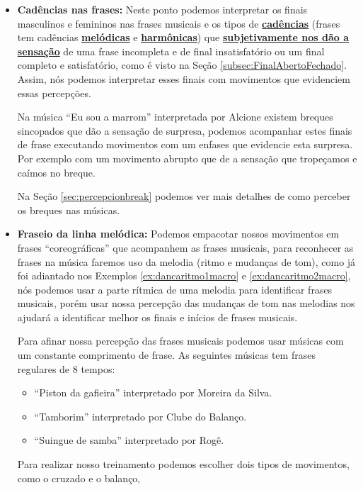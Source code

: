 \begin{itemize}
\begin{example}
\end{example}  
\item \textbf{Cadências nas frases:} Neste ponto podemos interpretar
os finais masculinos e femininos nas frases musicais  e  
os tipos de \hyperref[sec:Cadencia]{\textbf{cadências}}
(frases tem cadências 
\hyperref[subsec:cadenciamelodica]{\textbf{melódicas}} e 
\hyperref[sec:CadenciaHarmonica]{\textbf{harmônicas}})   
que \hyperref[subsec:FinalAbertoFechado]{\textbf{subjetivamente nos dão a sensação}} 
de uma frase incompleta e de final insatisfatório ou um final completo e satisfatório, como é visto na Seção \ref{subsec:FinalAbertoFechado}.
Assim, nós podemos interpretar esses finais com movimentos que evidenciem 
essas percepções.
\begin{example}
Na música ``Eu sou a marrom'' interpretada por Alcione existem breques sincopados
que dão a sensação de surpresa, podemos acompanhar estes finais de frase executando movimentos 
com um enfases que evidencie esta surpresa. Por exemplo com um movimento abrupto 
que de a sensação que tropeçamos e caímos no breque. 
\end{example}  
Na Seção \ref{sec:percepcionbreak} podemos ver mais detalhes de como perceber os breques nas músicas.
\item \textbf{Fraseio da linha melódica:} Podemos empacotar nossos movimentos em frases ``coreográficas''
que acompanhem as frases musicais, para reconhecer as frases na música faremos uso da melodia (ritmo e mudanças de tom),
como já foi adiantado nos Exemplos \ref{ex:dancaritmo1macro} e \ref{ex:dancaritmo2macro},
nós podemos usar a parte rítmica de uma melodia para identificar frases musicais,
porém usar nossa percepção das mudanças de tom nas melodias nos ajudará a identificar melhor 
os finais e inícios de frases musicais.
\begin{example} Para afinar nossa percepção das frases musicais
podemos usar músicas com um constante comprimento de frase.
As seguintes músicas tem frases regulares de 8 tempos:
\begin{itemize}
\item ``Piston da gafieira'' interpretado por Moreira da Silva.
\item ``Tamborim'' interpretado por Clube do Balanço.
\item ``Suingue de samba'' interpretado por Rogê.
\end{itemize}
Para realizar nosso treinamento podemos escolher dois tipos de movimentos, como o cruzado e o balanço,

\end{example}
\end{itemize}
